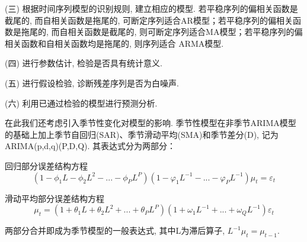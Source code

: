 \documentclass[11pt]{article}
\begin{document}
\qquad  (三) 根据时间序列模型的识别规则, 建立相应的模型. 若平稳序列的偏相关函数是截尾的, 而自相关函数是拖尾的, 可断定序列适合AR模型；若平稳序列的偏相关函数是拖尾的, 而自相关函数是截尾的, 则可断定序列适合MA模型；若平稳序列的偏相关函数和自相关函数均是拖尾的, 则序列适合 ARMA模型. 

\qquad  (四) 进行参数估计, 检验是否具有统计意义. 

\qquad  (五) 进行假设检验, 诊断残差序列是否为白噪声. 

\qquad  (六) 利用已通过检验的模型进行预测分析. 

\qquad 在此我们还考虑引入季节性变化对模型的影响. 季节性模型在非季节ARIMA模型的基础上加上季节自回归(SAR)、季节滑动平均(SMA)和季节差分(D), 记为ARIMA(p,d,q)(P,D,Q). 其表达式分为两部分：

回归部分误差结构方程
\[(1-\phi_1L-\phi_2L^2-...-\phi_PL^P)(1-\varphi_1L^{-1}-...-\varphi_PL^{-1})\mu_t=\varepsilon_t\]

滑动平均部分误差结构方程\[\mu_t=(1+\theta_1L+\theta_2L^2+...+\theta_PL^P)(1+\omega_1L^{-1}+...+\omega_QL^{-1})\varepsilon_t\]

两部分合并即成为季节模型的一般表达式, 其中L为滞后算子, $L^{-1}\mu_t=\mu_{t-1}$. 
\end{document}
